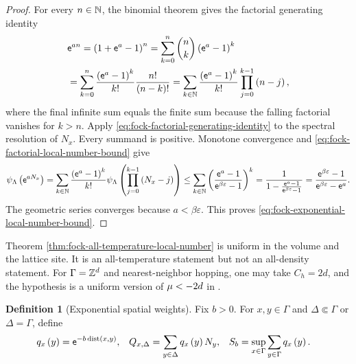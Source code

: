 \documentclass[11pt,a4paper]{article}
\theoremstyle{plain}
\theoremstyle{definition}
\newtheorem{defn}[thm]{Definition}
\theoremstyle{remark}
\begin{document}
\begin{proof}
For every $n \in \mathbb{N}$, the binomial theorem gives the factorial generating identity
\begin{equation}
\begin{aligned}
&
\mathsf{e}^{a n}
=
\left( 1+\mathsf{e}^{a}-1 \right)^{n}
=
\sum_{k=0}^{n}
\binom{n}{k}\left( \mathsf{e}^{a}-1 \right)^{k}
\\
& =
\sum_{k=0}^{n}
\frac{\left( \mathsf{e}^{a}-1 \right)^{k}}{k!}
\frac{n!}{\left( n-k \right)!}
=
\sum_{k \in \mathbb{N}}
\frac{\left( \mathsf{e}^{a} - 1 \right)^{k}}{k!}
\prod_{j = 0}^{k - 1}\left( n - j \right),
\end{aligned}
\label{eq:fock-factorial-generating-identity}
\end{equation}
where the final infinite sum equals the finite sum because the falling factorial vanishes for $k>n$.
Apply \eqref{eq:fock-factorial-generating-identity} to the spectral resolution of $N_x$.
Every summand is positive.
Monotone convergence and \eqref{eq:fock-factorial-local-number-bound} give
$$\begin{aligned}
\fun{\oastate[\psi_{\Lambda}]}{\napiernum^{aN_x}}
=
\sum_{k \in \monnat}
\frac{\rbk{\napiernum^{a}-1}^{k}}{k!}
\fun{\oastate[\psi_{\Lambda}]}{
\prod_{j=0}^{k-1}\rbk{N_x-j}}
\leq
\sum_{k \in \monnat}
\rbk{
\frac{\napiernum^{a}-1}
{\napiernum^{\beta\varepsilon}-1}}^{k}
=
\frac{1}
{1-\frac{\napiernum^{a}-1}{\napiernum^{\beta\varepsilon}-1}}
=
\frac{\napiernum^{\beta\varepsilon} - 1}
{\napiernum^{\beta\varepsilon} - \napiernum^{a}}.
\end{aligned}$$
The geometric series converges because $a < \beta\varepsilon$.
This proves \eqref{eq:fock-exponential-local-number-bound}.
\end{proof}

Theorem \ref{thm:fock-all-temperature-local-number} is uniform in the volume and the lattice site. It is an all-temperature statement but not an all-density statement. For \(\Gamma = \mathbb{Z}^{d}\) and nearest-neighbor hopping, one may take \(C_h = 2d\), and the hypothesis is a uniform version of \(\smchemicalpotential < -2d\) in \cite[Remark 5.3]{DeuchertLampartLemm001}.

\begin{defn}[Exponential spatial weights]\label{def:fock-exponential-spatial-weights}
Fix $b>0$.
For $x,y\in\Gamma$ and $\Delta\Subset\Gamma$ or $\Delta=\Gamma$, define
\begin{equation}
\begin{aligned}
q_x \left( y \right)
& =
\mathsf{e}^{-b\operatorname{dist} \left( x,y \right)},
&
Q_{x,\Delta}
& =
\sum_{y\in\Delta}q_x \left( y \right)N_y,
&
S_b
& =
\sup_{x\in\Gamma}\sum_{y\in\Gamma}q_x \left( y \right).
\end{aligned}
\label{eq:fock-exponential-spatial-weights}
\end{equation}
\end{defn}
\end{document}
